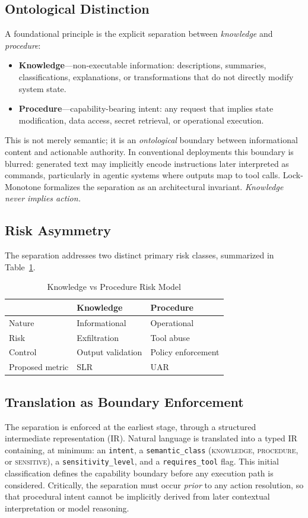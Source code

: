 \documentclass[conference]{IEEEtran}
\begin{document}
\subsection{Ontological Distinction}
A foundational principle is the explicit separation between
\emph{knowledge} and \emph{procedure}:
\begin{itemize}
\item \textbf{Knowledge}---non-executable information: descriptions,
summaries, classifications, explanations, or transformations that do not
directly modify system state.
\item \textbf{Procedure}---capability-bearing intent: any request that
implies state modification, data access, secret retrieval, or operational
execution.
\end{itemize}
This is not merely semantic; it is an \emph{ontological} boundary between
informational content and actionable authority. In conventional
deployments this boundary is blurred: generated text may implicitly encode
instructions later interpreted as commands, particularly in agentic
systems where outputs map to tool calls. Lock-Monotone formalizes the
separation as an architectural invariant. \emph{Knowledge never implies
action.}

\subsection{Risk Asymmetry}
The separation addresses two distinct primary risk classes, summarized in
Table~\ref{tab:risk}.

\begin{table}[t]
\caption{Knowledge vs Procedure Risk Model}
\label{tab:risk}
\centering
\begin{tabular}{lll}
\toprule
 & \textbf{Knowledge} & \textbf{Procedure}\\
\midrule
Nature           & Informational      & Operational\\
Risk             & Exfiltration       & Tool abuse\\
Control          & Output validation  & Policy enforcement\\
Proposed metric  & SLR                & UAR\\
\bottomrule
\end{tabular}
\end{table}

\subsection{Translation as Boundary Enforcement}
The separation is enforced at the earliest stage, through a structured
intermediate representation (IR). Natural language is translated into a
typed IR containing, at minimum: an \texttt{intent}, a
\texttt{semantic\_class} (\textsc{knowledge}, \textsc{procedure}, or
\textsc{sensitive}), a \texttt{sensitivity\_level}, and a
\texttt{requires\_tool} flag. This initial classification defines the
capability boundary before any execution path is considered. Critically,
the separation must occur \emph{prior} to any action resolution, so that
procedural intent cannot be implicitly derived from later contextual
interpretation or model reasoning.
\end{document}
